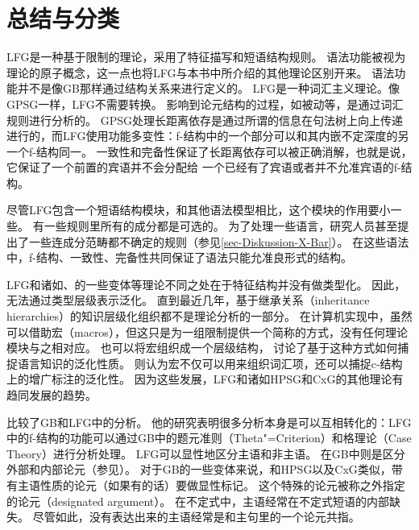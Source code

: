 \section{总结与分类}

LFG是一种基于限制的理论，采用了特征描写和短语结构规则。
语法功能被视为理论的原子概念，这一点也将LFG与本书中所介绍的其他理论区别开来。
语法功能并不是像GB那样通过结构关系来进行定义的。
LFG是一种词汇主义理论。像GPSG一样，LFG不需要转换。
影响到论元结构的过程，如被动等，是通过词汇规则进行分析的。
GPSG处理长距离依存是通过所谓的信息在句法树上向上传递进行的，而LFG使用功能多变性：f-结构中的一个部分可以和其内嵌不定深度的另一个f-结构同一。
一致性和完备性保证了长距离依存可以被正确消解，也就是说，它保证了一个前置的宾语并不会分配给
一个已经有了宾语或者并不允准宾语的f-结构。

尽管LFG包含一个短语结构模块，和其他语法模型相比，这个模块的作用要小一些。
有一些规则里所有的成分都是可选的。
为了处理一些语言，研究人员甚至提出了一些连成分范畴都不确定的规则（参见\ref{sec-Diskussion-X-Bar}）。
在这些语法中，f-结构、一致性、完备性共同保证了语法只能允准良形式的结构。

LFG和诸如\hpsgc、\cxgc 的一些变体等理论不同之处在于特征结构并没有做类型化。
因此，无法通过类型层级表示泛化。
直到最近几年，基于继承关系（inheritance hierarchies）的知识层级化组织都不是理论分析的一部分。
在计算机实现中，虽然可以借助宏（macros），但这只是为一组限制提供一个简称的方式，没有任何理论模块与之相对应。
也可以将宏组织成一个层级结构， 讨论了基于这种方式如何捕捉语言知识的泛化性质。
 \citet*{ADT2008a}则认为宏不仅可以用来组织词汇项，还可以捕捉c-结构上的增广标注的泛化性。
因为这些发展，LFG和诸如HPSG和CxG的其他理论有趋同发展的趋势。

 \citet{Williams84a}比较了GB和LFG中的分析。
他的研究表明很多分析本身是可以互相转化的：LFG中的f-结构的功能可以通过GB中的题元准则（Theta"=Criterion）和格理论（Case Theory）进行分析处理。
LFG可以显性地区分主语和非主语。
在GB中则是区分外部和内部论元（参见\citealp[\S~1.2]{Williams84a}）。
对于GB的一些变体来说，和HPSG\indexhpsgc 以及CxG\indexcxgc 类似，带有主语性质的论元（如果有的话）要做显性标记\citep{Haider86,HM94a,Mueller2003e,MR2001a}。
这个特殊的论元被称之外指定的论元（designated argument）。
在不定式中，主语经常在不定式短语的内部缺失。
尽管如此，没有表达出来的主语经常是和主句里的一个论元共指。


